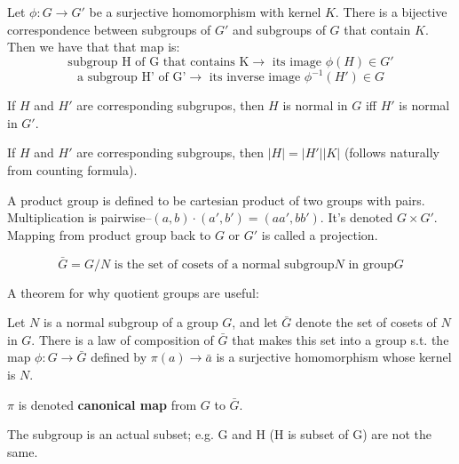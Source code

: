 \begin{definition}
  Let $\phi: G \rightarrow G'$ be a surjective homomorphism with kernel $K$. There is a
  bijective correspondence between subgroups of $G'$ and subgroups of $G$ that
  contain $K$. Then we have that that map is:
  \[\text{subgroup H of G that contains K} \rightarrow \text{ its image } \phi(H) \in G'\]
  \[\text{a subgroup H' of G'} \rightarrow \text{ its inverse image }\phi^{-1}(H') \in G\]

  If $H$ and $H'$ are corresponding subgrupos, then $H$ is normal in $G$ iff $H'$
  is normal in $G'$.

  If $H$ and $H'$ are corresponding subgroups, then $|H| = |H'||K|$
  (follows naturally from counting formula).

\end{definition}

\begin{definition}

  A product group is defined to be cartesian product of two groups with pairs.
  Multiplication is pairwise--$(a, b) \cdot (a',b')=(aa', bb')$. It's denoted $G \times G'$.
  Mapping from product group back to $G$ or $G'$ is called a projection.

\end{definition}

\begin{definition}
  \[\bar{G} = G / N \text{ is the set of cosets of a normal subgroup} N
    \text{ in group} G\]

  A theorem for why quotient groups are useful:

  Let $N$ is a normal subgroup of a group $G$, and let $\bar{G}$ denote the set
  of cosets of $N$ in $G$. There is a law of composition of $\bar{G}$ that makes
  this set into a group s.t. the map $\phi:G \rightarrow \bar{G}$ defined by
  $\pi(a) \rightarrow \bar{a}$ is a surjective homomorphism whose kernel is $N$.

  $\pi$ is denoted \textbf{canonical map} from $G$ to $\bar{G}$.


\end{definition}

\begin{definition}
  The subgroup is an actual subset; e.g. G and H (H is subset of G) are not the
  same.

\end{definition}

